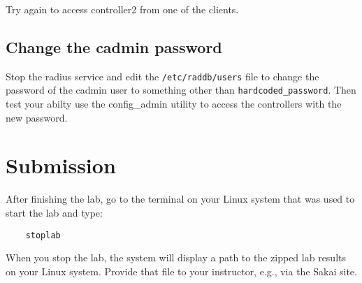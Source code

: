 Try again to access controller2 from one of the clients.

\subsection{Change the cadmin password}
Stop the radius service and edit the {\tt /etc/raddb/users} file to change the 
password of the cadmin user to something other than {\tt hardcoded\_password}.  Then test your abilty
use the config\_admin  utility to access the controllers with the new password.

\section{Submission}
After finishing the lab, go to the terminal on your Linux system that was used to start the lab and type:
\begin{verbatim}
    stoplab 
\end{verbatim}
When you stop the lab, the system will display a path to the zipped lab results on your Linux system.  Provide that file to 
your instructor, e.g., via the Sakai site.


